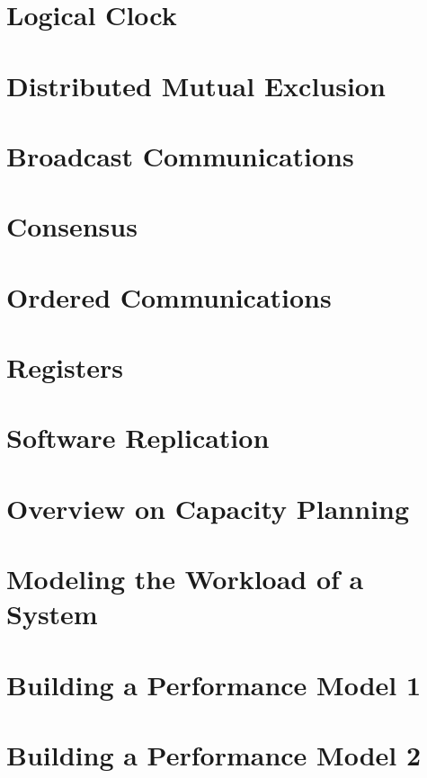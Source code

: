 	\section{Logical Clock}
	
	\newpage
	\section{Distributed Mutual Exclusion}
	
	\newpage
	\section{Broadcast Communications}
	
	\newpage
	\section{Consensus}
	
	\newpage
	\section{Ordered Communications}
	
	\newpage
	\section{Registers}
	
	\newpage
	\section{Software Replication}
	
	\newpage
	\section{Overview on Capacity Planning}
	
	\newpage
	\section{Modeling the Workload of a System}
	
	\newpage
	\section{Building a Performance Model 1}
	
	\newpage
	\section{Building a Performance Model 2}
	
